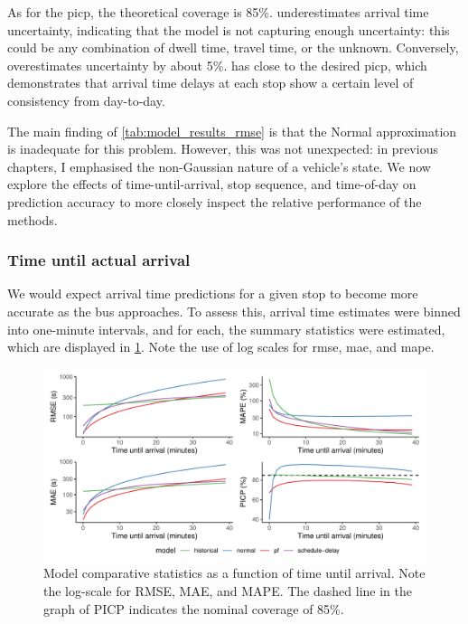 As for the \gls{picp}, the theoretical coverage is 85\%. \Fpf{} underestimates arrival time uncertainty, indicating that the model is not capturing enough uncertainty: this could be any combination of dwell time, travel time, or the unknown. Conversely, \Fnorm{} overestimates uncertainty by about 5\%. \Fhist{} has close to the desired \gls{picp}, which demonstrates that arrival time delays at each stop show a certain level of consistency from day-to-day.


The main finding of \cref{tab:model_results_rmse} is that the Normal approximation is inadequate for this problem. However, this was not unexpected: in previous chapters, I emphasised the non-Gaussian nature of a vehicle's state. We now explore the effects of time-until-arrival, stop sequence, and time-of-day on prediction accuracy to more closely inspect the relative performance of the methods.


\subsubsection{Time until actual arrival}

We would expect arrival time predictions for a given stop to become more accurate as the bus approaches. To assess this, arrival time estimates were binned into one-minute intervals, and for each, the summary statistics were estimated, which are displayed in \cref{fig:model_results_rmse_time}. Note the use of log scales for \gls{rmse}, \gls{mae}, and \gls{mape}.


\begin{knitrout}\small
{}\color{fgcolor}\begin{figure}
\includegraphics[width=\textwidth]{figure/model_results_rmse_time-1} \caption[Model comparative statistics as a function of time until arrival]{Model comparative statistics as a function of time until arrival. Note the log-scale for RMSE, MAE, and MAPE. The dashed line in the graph of PICP indicates the nominal coverage of 85\%.}\label{fig:model_results_rmse_time}
\end{figure}


\end{knitrout}

